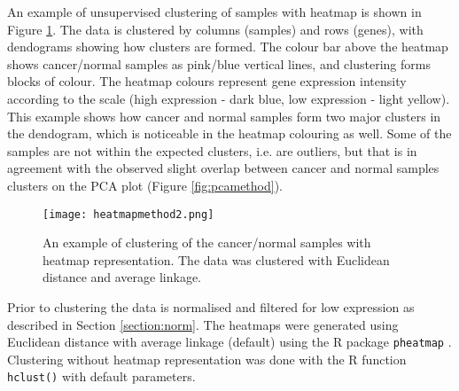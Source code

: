     

   An example of unsupervised clustering of samples with heatmap is shown in Figure \ref{fig:heatmapmethod}. The data is clustered by columns (samples) and rows (genes), with dendograms showing how clusters are formed. The colour bar above the heatmap shows cancer/normal samples as pink/blue vertical lines, and clustering forms blocks of colour. The heatmap colours  represent gene expression intensity according to the scale (high expression - dark blue, low expression - light yellow). 
   This example shows how cancer and normal samples form two major clusters in the dendogram, which is noticeable in the heatmap colouring as well. Some of the samples are not within the expected clusters, i.e. are outliers, but that is in agreement with the observed  slight overlap between cancer and normal samples clusters on the PCA plot (Figure \ref{fig:pcamethod}).

        \begin{figure}[h]
        \centering
        \texttt{[image: heatmapmethod2.png]}
        \caption[Clustering with heatmap example]{An example of clustering of the cancer/normal samples with heatmap representation. The data was clustered with Euclidean distance and average linkage. }
        \label{fig:heatmapmethod}
        \end{figure}
    
    Prior to clustering the data is normalised and filtered for low expression as described in Section \ref{section:norm}. The heatmaps were generated using Euclidean distance with average linkage (default) using the R package  \texttt{pheatmap} \cite{kolde2012pheatmap}. Clustering without heatmap representation was done with the R function \texttt{hclust()} with default parameters.


   



 

